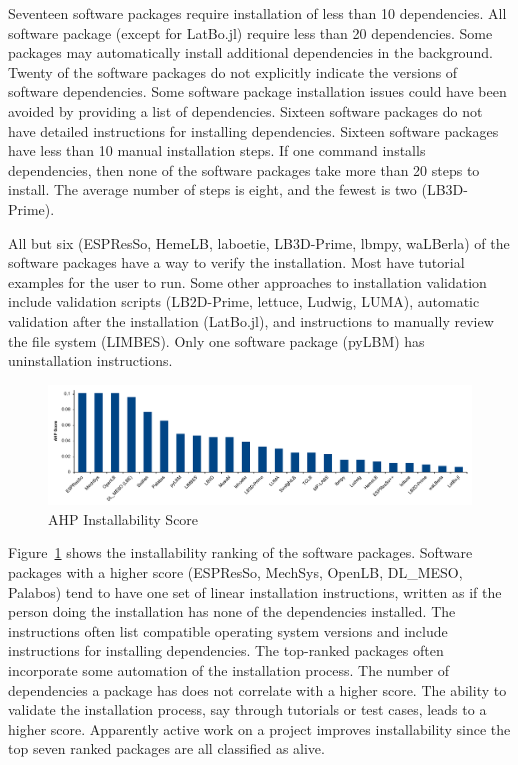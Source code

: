 \documentclass[final, 3p, times, authoryear]{elsarticle}
\begin{document}
Seventeen software packages require installation of less than 10 dependencies.
All software package (except for LatBo.jl) require less than 20 dependencies.
Some packages may automatically install additional dependencies in the
background. Twenty of the software packages do not explicitly indicate the
versions of software dependencies. Some software package installation issues
could have been avoided by providing a list of dependencies. Sixteen software
packages do not have detailed instructions for installing dependencies. Sixteen
software packages have less than 10 manual installation steps. If one command
installs dependencies, then none of the software packages take more than 20
steps to install. The average number of steps is eight, and the fewest is two
(LB3D-Prime).

All but six (ESPResSo, HemeLB, laboetie, LB3D-Prime, lbmpy, waLBerla) of the
software packages have a way to verify the installation. Most have tutorial
examples for the user to run. Some other approaches to installation validation
include validation scripts (LB2D-Prime, lettuce, Ludwig, LUMA), automatic
validation after the installation (LatBo.jl), and instructions to manually
review the file system (LIMBES). Only one software package (pyLBM) has
uninstallation instructions.

\begin{figure}[h!]
	\begin{center}
		\includegraphics[width=1.0\textwidth]{./figures/installability_chart.pdf}
		\caption{AHP Installability Score}
		\label{Fig_Installability}
	\end{center}
\end{figure}

Figure~\ref{Fig_Installability} shows the installability ranking of the software
packages. Software packages with a higher score (ESPResSo, MechSys, OpenLB,
DL\_MESO, Palabos) tend to have one set of linear installation instructions,
written as if the person doing the installation has none of the dependencies
installed. The instructions often list compatible operating system versions and
include instructions for installing dependencies. The top-ranked packages often
incorporate some automation of the installation process. The number of
dependencies a package has does not correlate with a higher score. The ability
to validate the installation process, say through tutorials or test cases, leads
to a higher score. Apparently active work on a project improves installability
since the top seven ranked packages are all classified as alive. 
 
\end{document}
